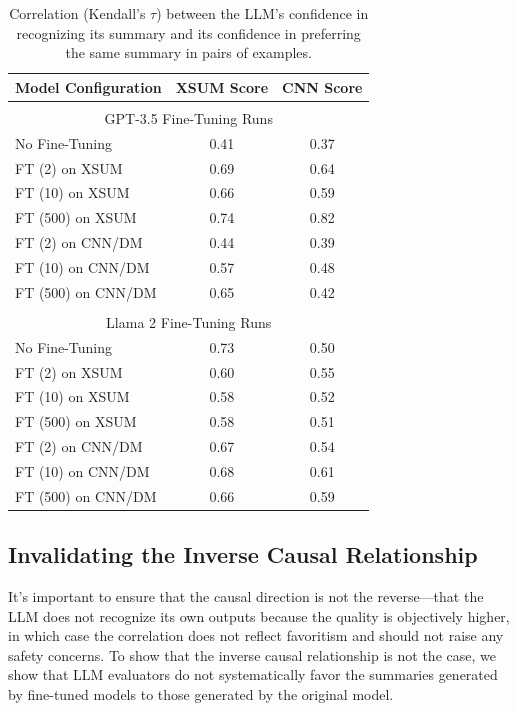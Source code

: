\documentclass{article}
\theoremstyle{plain}
\theoremstyle{definition}
\theoremstyle{remark}
\begin{document}
\begin{table}[h]
\centering
\begin{tabular}{l|c c}
\textbf{Model Configuration} & \textbf{XSUM Score} & \textbf{CNN Score} \\ \hline
\multicolumn{1}{c}{} & \multicolumn{2}{c}{} \\ 
\multicolumn{3}{c}{GPT-3.5 Fine-Tuning Runs} \\
No Fine-Tuning     & 0.41 & 0.37 \\
FT (2) on XSUM     & 0.69 & 0.64 \\
FT (10) on XSUM    & 0.66 & 0.59 \\
FT (500) on XSUM   & 0.74 & 0.82 \\
FT (2) on CNN/DM   & 0.44 & 0.39 \\
FT (10) on CNN/DM  & 0.57 & 0.48 \\
FT (500) on CNN/DM & 0.65 & 0.42 \\
\multicolumn{1}{c}{} & \multicolumn{2}{c}{} \\ 
\multicolumn{3}{c}{Llama 2 Fine-Tuning Runs} \\
No Fine-Tuning     & 0.73 & 0.50 \\
FT (2) on XSUM     & 0.60 & 0.55 \\
FT (10) on XSUM    & 0.58 & 0.52 \\
FT (500) on XSUM   & 0.58 & 0.51 \\
FT (2) on CNN/DM   & 0.67 & 0.54 \\
FT (10) on CNN/DM  & 0.68 & 0.61 \\
FT (500) on CNN/DM & 0.66 & 0.59 \\

\end{tabular}
\caption{Correlation (Kendall's $\tau$) between the LLM's confidence in recognizing its summary and its confidence in preferring the same summary in pairs of examples.}
\label{table:cross_dataset_pairwise_scaling}
\end{table}


\subsection{Invalidating the Inverse Causal Relationship}
\label{sec:inverse_causal}

It's important to ensure that the causal direction is not the reverse---that the LLM does not recognize its own outputs because the quality is objectively higher, in which case the correlation does not reflect favoritism and should not raise any safety concerns.
To show that the inverse causal relationship is not the case, we show that LLM evaluators do not systematically favor the summaries generated by fine-tuned models to those generated by the original model.
\end{document}
